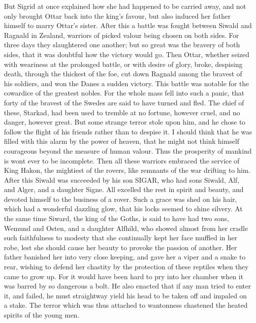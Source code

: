 \documentclass[10pt,a4paper]{report}
\begin{document}
But Sigrid at once explained how she had happened to be carried away, and not only brought Ottar back into the king's favour, but also induced her father himself to marry Ottar's sister. After this a battle was fought between Siwald and Ragnald in Zealand, warriors of picked valour being chosen on both sides. For three days they slaughtered one another; but so great was the bravery of both sides, that it was doubtful how the victory would go. Then Ottar, whether seized with weariness at the prolonged battle, or with desire of glory, broke, despising death, through the thickest of the foe, cut down Ragnald among the bravest of his soldiers, and won the Danes a sudden victory. This battle was notable for the cowardice of the greatest nobles. For the whole mass fell into such a panic, that forty of the bravest of the Swedes are said to have turned and fled. The chief of these, Starkad, had been used to tremble at no fortune, however cruel, and no danger, however great. But some strange terror stole upon him, and he chose to follow the flight of his friends rather than to despise it. I should think that he was filled with this alarm by the power of heaven, that he might not think himself courageous beyond the measure of human valour. Thus the prosperity of mankind is wont ever to be incomplete. Then all these warriors embraced the service of King Hakon, the mightiest of the rovers, like remnants of the war drifting to him.\\

After this Siwald was succeeded by his son SIGAR, who had sons Siwald, Alf, and Alger, and a daughter Signe. All excelled the rest in spirit and beauty, and devoted himself to the business of a rover. Such a grace was shed on his hair, which had a wonderful dazzling glow, that his locks seemed to shine silvery. At the same time Siward, the king of the Goths, is said to have had two sons, Wemund and Osten, and a daughter Alfhild, who showed almost from her cradle such faithfulness to modesty that she continually kept her face muffled in her robe, lest she should cause her beauty to provoke the passion of another. Her father banished her into very close keeping, and gave her a viper and a snake to rear, wishing to defend her chastity by the protection of these reptiles when they came to grow up. For it would have been hard to pry into her chamber when it was barred by so dangerous a bolt. He also enacted that if any man tried to enter it, and failed, he must straightway yield his head to be taken off and impaled on a stake. The terror which was thus attached to wantonness chastened the heated spirits of the young men.\\
\end{document}
